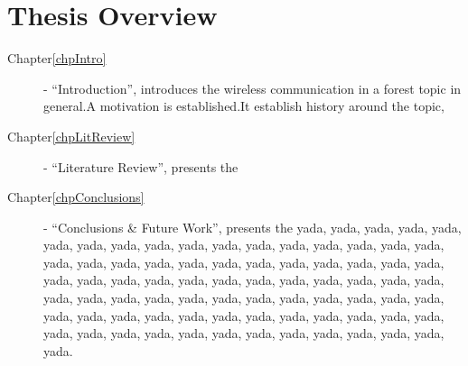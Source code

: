 
\section{Thesis Overview}
\label{chpIntro-secThesisOverview}

\begin{description}
	\item[Chapter\ref{chpIntro}] - ``Introduction'', introduces the wireless communication in a forest topic in general.A motivation is established.It establish history around the topic,
	\item[Chapter\ref{chpLitReview}] - ``Literature Review'', 
	presents the 
	\item[Chapter\ref{chpConclusions}] - ``Conclusions \& Future Work'', presents the yada, yada, yada, yada, yada, yada,
		yada, yada, yada, yada, yada, yada, yada, yada, yada, yada, yada, yada, yada, yada, yada, yada, yada, yada,
		yada, yada, yada, yada, yada, yada, yada, yada, yada, yada, yada, yada, yada, yada, yada, yada, yada, yada,
		yada, yada, yada, yada, yada, yada, yada, yada, yada, yada, yada, yada, yada, yada, yada, yada, yada, yada,
		yada, yada, yada, yada, yada, yada, yada, yada, yada, yada, yada, yada, yada, yada, yada, yada, yada, yada.
\end{description}

